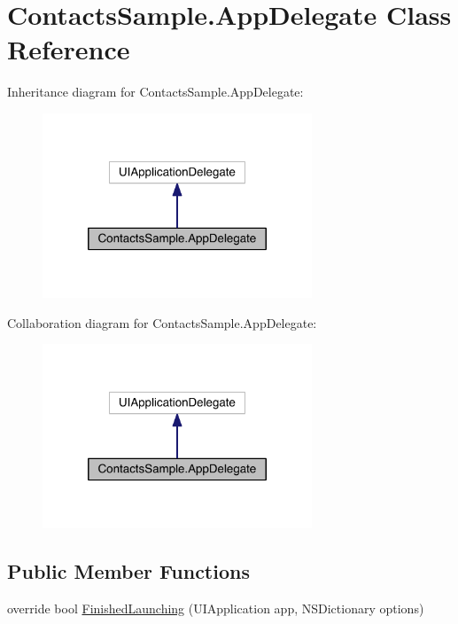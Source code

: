 \hypertarget{class_contacts_sample_1_1_app_delegate}{\section{Contacts\+Sample.\+App\+Delegate Class Reference}
\label{class_contacts_sample_1_1_app_delegate}
}


Inheritance diagram for Contacts\+Sample.\+App\+Delegate\+:
\nopagebreak
\begin{figure}[H]
\begin{center}
\leavevmode
\includegraphics[width=228pt]{class_contacts_sample_1_1_app_delegate__inherit__graph}
\end{center}
\end{figure}


Collaboration diagram for Contacts\+Sample.\+App\+Delegate\+:
\nopagebreak
\begin{figure}[H]
\begin{center}
\leavevmode
\includegraphics[width=228pt]{class_contacts_sample_1_1_app_delegate__coll__graph}
\end{center}
\end{figure}
\subsection*{Public Member Functions}
\begin{DoxyCompactItemize}
\item 
override bool \hyperlink{class_contacts_sample_1_1_app_delegate_ab8caf2a71e9143848e49a1ae9e9761a1}{Finished\+Launching} (U\+I\+Application app, N\+S\+Dictionary options)
\end{DoxyCompactItemize}


